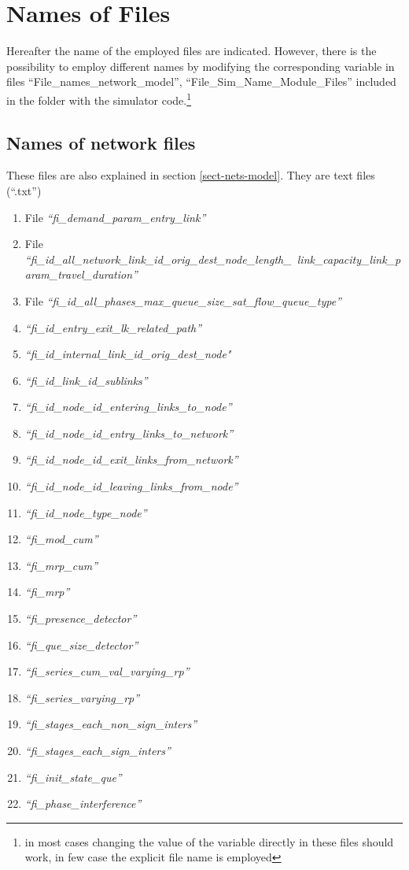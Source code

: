 

\section{Names of  Files}

Hereafter the name of the employed files are indicated. However, there is the possibility to employ different names by  modifying the corresponding variable in files  ``File\_names\_network\_model'', ``File\_Sim\_Name\_Module\_Files'' included in the folder with the simulator code.\footnote{in most cases changing the  value of the variable directly in these files should work,  in few case the explicit file name is employed}

\subsection{Names of network files}

These files are also explained in section \ref{sect-nets-model}. They are text files (``.txt'')
\begin{enumerate}
\item  File \emph{``fi\_demand\_param\_entry\_link''}
\item File \emph{``fi\_id\_all\_network\_link\_id\_orig\_dest\_node\_length\_\
link\_capacity\_link\_param\_travel\_duration''} 
\item  File \emph{``fi\_id\_all\_phases\_max\_queue\_size\_sat\_flow\_queue\_type''}
\item \emph{``fi\_id\_entry\_exit\_lk\_related\_path''} 
\item \emph{``fi\_id\_internal\_link\_id\_orig\_dest\_node"}
\item \emph{``fi\_id\_link\_id\_sublinks''}
\item \emph{``fi\_id\_node\_id\_entering\_links\_to\_node''}
\item \emph{``fi\_id\_node\_id\_entry\_links\_to\_network''} 
\item \emph{``fi\_id\_node\_id\_exit\_links\_from\_network''}
\item \emph{``fi\_id\_node\_id\_leaving\_links\_from\_node''}
\item \emph{``fi\_id\_node\_type\_node''}
\item \emph{``fi\_mod\_cum''}
\item \emph{``fi\_mrp\_cum''}
\item \emph{``fi\_mrp''}
\item \emph{``fi\_presence\_detector''}
\item \emph{``fi\_que\_size\_detector''}
\item \emph{``fi\_series\_cum\_val\_varying\_rp''}
\item \emph{``fi\_series\_varying\_rp''}
\item \emph{``fi\_stages\_each\_non\_sign\_inters''}
\item \emph{``fi\_stages\_each\_sign\_inters''}
\item \emph{``fi\_init\_state\_que''}
\item \emph{``fi\_phase\_interference''}
\end{enumerate}

